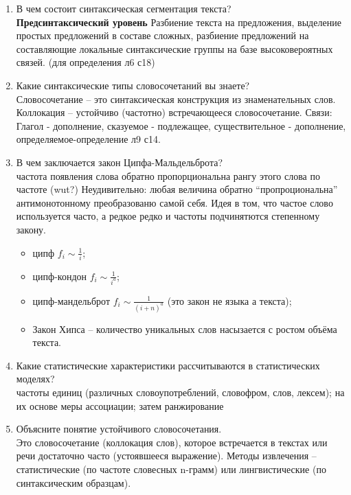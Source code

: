 \documentclass[a4paper]{article}
\begin{document}
\begin{enumerate}
	\item В чем состоит синтаксическая сегментация текста?\hfill\\
	\textbf{Предсинтаксический уровень} Разбиение текста на предложения, выделение простых предложений в составе сложных, разбиение предложений на составляющие локальные синтаксические группы на базе высоковероятных связей. (для определения л6 с18)

	\item Какие синтаксические типы словосочетаний вы знаете?\hfill\\
	Словосочетание -- это синтаксическая конструкция из знаменательных слов. Коллокация -- устойчиво (частотно) встречающееся словосочетание. Связи: Глагол - дополнение, сказуемое - подлежащее, существительное - дополнение, определяемое-определение л9 с14.

	\item В чем заключается закон Ципфа-Мальдельброта?\hfill\\
	частота появления слова обратно пропорциональна рангу этого слова по частоте (wut?) Неудивительно: любая величина обратно ``пропроциональна'' антимонотонному преобразованю самой себя. Идея в том, что частое слово используется часто, а редкое редко и частоты подчинятются степенному закону. \begin{itemize}
		\item ципф $f_i\sim \frac{1}{i}$;
		\item ципф-кондон $f_i\sim \frac{1}{i^a}$;
		\item ципф-мандельброт $f_i\sim \frac{1}{(i+n)^a}$ (это закон не языка а текста);
		\item Закон Хипса -- количество уникальных слов насызается с ростом объёма текста.
	\end{itemize}

	\item Какие статистические характеристики рассчитываются в статистических моделях?\hfill\\
	частоты единиц (различных словоупотреблений, словофром, слов, лексем); на их основе меры ассоциации; затем ранжирование

	\item Объясните понятие устойчивого словосочетания.\hfill\\
	Это словосочетание (коллокация слов), которое встречается в текстах или речи достаточно часто (устоявшееся выражение). Методы извлечения -- статистические (по частоте словесных n-грамм) или лингвистические (по синтаксическим образцам).


\end{enumerate}
\end{document}
